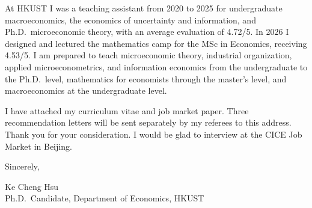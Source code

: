 \documentclass[11pt]{article}
\begin{document}
At HKUST I was a teaching assistant from 2020 to 2025 for undergraduate macroeconomics, the economics of uncertainty and information, and Ph.D.\ microeconomic theory, with an average evaluation of 4.72/5. In 2026 I designed and lectured the mathematics camp for the MSc in Economics, receiving 4.53/5. I am prepared to teach microeconomic theory, industrial organization, applied microeconometrics, and information economics from the undergraduate to the Ph.D.\ level, mathematics for economists through the master's level, and macroeconomics at the undergraduate level.

I have attached my curriculum vitae and job market paper. Three recommendation letters will be sent separately by my referees to this address. Thank you for your consideration. I would be glad to interview at the CICE Job Market in Beijing.

\vspace{0.7em}
Sincerely,

\vspace{0.7em}
Ke Cheng Hsu \\
Ph.D.\ Candidate, Department of Economics, HKUST
\end{document}

